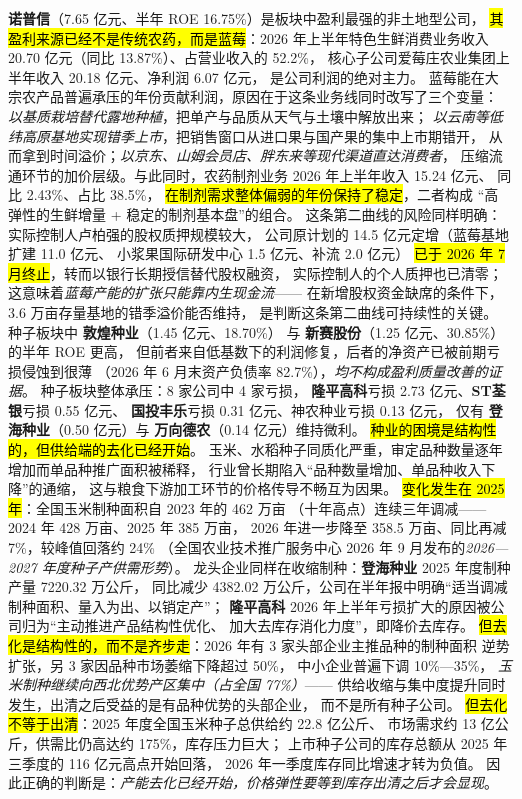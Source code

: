 \textbf{诺普信}（\num{7.65} 亿元、半年 ROE \num{16.75}\%）是板块中盈利最强的非土地型公司，
\hl{其盈利来源已经不是传统农药，而是蓝莓}：2026 年上半年特色生鲜消费业务收入
\num{20.70} 亿元（同比 \num{+13.87}\%）、占营业收入的 \num{52.2}\%，
核心子公司爱莓庄农业集团上半年收入 \num{20.18} 亿元、净利润 \num{6.07} 亿元，
是公司利润的绝对主力。
蓝莓能在大宗农产品普遍承压的年份贡献利润，原因在于这条业务线同时改写了三个变量：
\emph{以基质栽培替代露地种植}，把单产与品质从天气与土壤中解放出来；
\emph{以云南等低纬高原基地实现错季上市}，把销售窗口从进口果与国产果的集中上市期错开，
从而拿到时间溢价；\emph{以京东、山姆会员店、胖东来等现代渠道直达消费者}，
压缩流通环节的加价层级。与此同时，农药制剂业务 2026 年上半年收入 \num{15.24} 亿元、
同比 \num{+2.43}\%、占比 \num{38.5}\%，
\hl{在制剂需求整体偏弱的年份保持了稳定}，二者构成
“高弹性的生鲜增量 + 稳定的制剂基本盘”的组合。
这条第二曲线的风险同样明确：实际控制人卢柏强的股权质押规模较大，
公司原计划的 \num{14.5} 亿元定增（蓝莓基地扩建 \num{11.0} 亿元、
小浆果国际研发中心 \num{1.5} 亿元、补流 \num{2.0} 亿元）
\hl{已于 2026 年 7 月终止}，转而以银行长期授信替代股权融资，
实际控制人的个人质押也已清零；这意味着\emph{蓝莓产能的扩张只能靠内生现金流}——
在新增股权资金缺席的条件下，\num{3.6} 万亩存量基地的错季溢价能否维持，
是判断这条第二曲线可持续性的关键。
种子板块中 \textbf{敦煌种业}（\num{1.45} 亿元、\num{18.70}\%）
与 \textbf{新赛股份}（\num{1.25} 亿元、\num{30.85}\%）的半年 ROE 更高，
但前者来自低基数下的利润修复，后者的净资产已被前期亏损侵蚀到很薄
（2026 年 6 月末资产负债率 \num{82.7}\%），\emph{均不构成盈利质量改善的证据}。
种子板块整体承压：\num{8} 家公司中 \num{4} 家亏损，
\textbf{隆平高科}亏损 \num{2.73} 亿元、\textbf{ST荃银}亏损 \num{0.55} 亿元、
\textbf{国投丰乐}亏损 \num{0.31} 亿元、神农种业亏损 \num{0.13} 亿元，
仅有 \textbf{登海种业}（\num{0.50} 亿元）与 \textbf{万向德农}（\num{0.14} 亿元）维持微利。
\hl{种业的困境是结构性的，但供给端的去化已经开始}。
玉米、水稻种子同质化严重，审定品种数量逐年增加而单品种推广面积被稀释，
行业曾长期陷入“品种数量增加、单品种收入下降”的通缩，
这与粮食下游加工环节的价格传导不畅互为因果。
\hl{变化发生在 2025 年}：全国玉米制种面积自 2023 年的 \num{462} 万亩
（十年高点）连续三年调减——2024 年 \num{428} 万亩、2025 年 \num{385} 万亩，
2026 年进一步降至 \num{358.5} 万亩、同比再减 \num{7}\%，较峰值回落约 \num{24}\%
（全国农业技术推广服务中心 2026 年 9 月发布的\emph{2026---2027 年度种子产供需形势}）。
龙头企业同样在收缩制种：\textbf{登海种业} 2025 年度制种产量 \num{7220.32} 万公斤，
同比减少 \num{4382.02} 万公斤，公司在半年报中明确“适当调减制种面积、量入为出、以销定产”；
\textbf{隆平高科} 2026 年上半年亏损扩大的原因被公司归为“主动推进产品结构性优化、
加大去库存消化力度”，即降价去库存。
\hl{但去化是结构性的，而不是齐步走}：2026 年有 \num{3} 家头部企业主推品种的制种面积
逆势扩张，另 \num{3} 家因品种市场萎缩下降超过 \num{50}\%，
中小企业普遍下调 \num{10}\%---\num{35}\%，
\emph{玉米制种继续向西北优势产区集中（占全国 \num{77}\%）}——
供给收缩与集中度提升同时发生，出清之后受益的是有品种优势的头部企业，
而不是所有种子公司。
\hl{但去化不等于出清}：2025 年度全国玉米种子总供给约 \num{22.8} 亿公斤、
市场需求约 \num{13} 亿公斤，供需比仍高达约 \num{175}\%，库存压力巨大；
上市种子公司的库存总额从 2025 年三季度的 \num{116} 亿元高点开始回落，
2026 年一季度库存同比增速才转为负值。
因此正确的判断是：\emph{产能去化已经开始，价格弹性要等到库存出清之后才会显现}。

